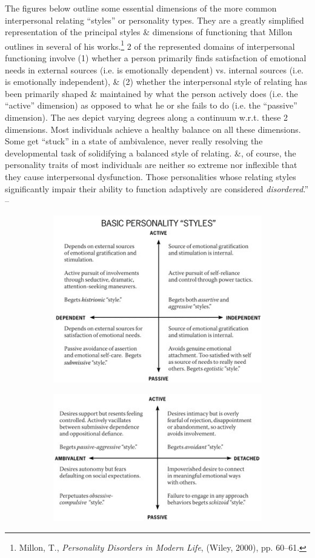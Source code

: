 \documentclass{article}
\numberwithin{equation}{section}
\begin{document}
The figures below outline some essential dimensions of the more common interpersonal relating ``styles'' or personality types. They are a greatly simplified representation of the principal styles \& dimensions of functioning that Millon outlines in several of his works.\footnote{Millon, T., \textit{Personality Disorders in Modern Life}, (Wiley, 2000), pp. 60--61.} 2 of the represented domains of interpersonal functioning involve (1) whether a person primarily finds satisfaction of emotional needs in external sources (i.e. is emotionally dependent) vs. internal sources (i.e. is emotionally independent), \& (2) whether the interpersonal style of relating has been primarily shaped \& maintained by what the person actively does (i.e. the ``active'' dimension) as opposed to what he or she fails to do (i.e. the ``passive'' dimension). The aes depict varying degrees along a continuum w.r.t. these 2 dimensions. Most individuals achieve a healthy balance on all these dimensions. Some get ``stuck'' in a state of ambivalence, never really resolving the developmental task of solidifying a balanced style of relating. \&, of course, the personality traits of most individuals are neither so extreme nor inflexible that they cause interpersonal dysfunction. Those personalities whose relating styles significantly impair their ability to function adaptively are considered \textit{disordered}.'' -- \cite[p. 54--56]{Simon2011}
\begin{figure}[H]
	\centering
	\begin{subfigure}[b]{0.49\textwidth}
		\centering
		\includegraphics[scale=0.55]{Simon2011_3}
	\end{subfigure}
	\begin{subfigure}[b]{0.49\textwidth}
		\centering
		\includegraphics[scale=0.55]{Simon2011_4}
	\end{subfigure}
\end{figure}
\end{document}

